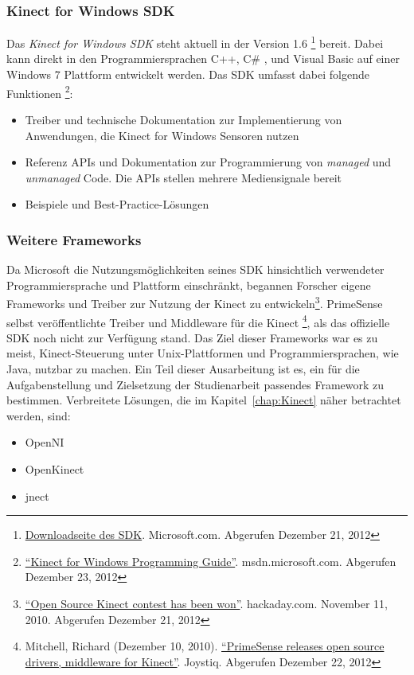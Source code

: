 \subsubsection{Kinect for Windows SDK}
\label{subsubsec:Kinect_SDK}
Das \textit{Kinect for Windows SDK} steht aktuell in der Version 1.6 \footnote{\href{https://www.microsoft.com/en-us/kinectforwindows/develop/}{Downloadseite des SDK}. Microsoft.com. Abgerufen Dezember 21, 2012}
bereit. Dabei kann direkt in den Programmiersprachen C++, C\# , und Visual Basic auf einer Windows 7 Plattform entwickelt werden.
\newline
Das SDK umfasst dabei folgende Funktionen \footnote{\href{http://msdn.microsoft.com/en-us/library/hh855348.aspx}{\enquote{Kinect for Windows Programming Guide}}. msdn.microsoft.com. Abgerufen Dezember 23, 2012}:
\begin{itemize}
  \item Treiber und technische Dokumentation zur Implementierung von Anwendungen, die Kinect for Windows Sensoren nutzen
  \item Referenz APIs und Dokumentation zur Programmierung von \textit{managed} und \textit{unmanaged} Code.
  Die APIs stellen mehrere Mediensignale bereit
  \item Beispiele und Best-Practice-L\"osungen
\end{itemize}
\subsubsection{Weitere Frameworks}
Da Microsoft die Nutzungsm\"oglichkeiten seines SDK hinsichtlich verwendeter Programmiersprache und Plattform einschr\"ankt, begannen Forscher eigene Frameworks und Treiber zur Nutzung der Kinect zu entwickeln\footnote{\href{http://hackaday.com/2010/11/11/open-source-kinect-contest-has-been-won/}{\enquote{Open Source Kinect contest has been won}}. hackaday.com. November 11, 2010. Abgerufen Dezember 21, 2012}.
PrimeSense selbst ver\"offentlichte Treiber und Middleware f\"ur die Kinect \footnote{Mitchell, Richard (Dezember 10, 2010). \href{http://www.joystiq.com/2010/12/10/primesense-releases-open-source-drivers-middleware-for-kinect/}{\enquote{PrimeSense releases open source drivers, middleware for Kinect}}. Joystiq. Abgerufen Dezember 22, 2012}, 
als das offizielle SDK noch nicht zur Verf\"ugung stand.
\newline
Das Ziel dieser Frameworks war es zu meist, Kinect-Steuerung unter Unix-Plattformen und Programmiersprachen, wie Java, nutzbar zu machen.
Ein Teil dieser Ausarbeitung ist es, ein f\"ur die Aufgabenstellung und Zielsetzung der Studienarbeit passendes Framework zu bestimmen.
\newline
Verbreitete L\"osungen, die im Kapitel~\ref{chap:Kinect} n\"aher betrachtet werden, sind:
\begin{itemize}
  \item OpenNI
  \item OpenKinect
  \item jnect
\end{itemize}

